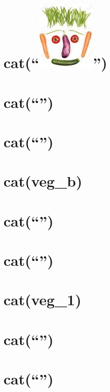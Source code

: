 \documentclass[]{article}
\begin{document}
\section{\texorpdfstring{cat(``\protect\includegraphics{vegetable.jpg}'')}{cat()}}\label{cat-12}

\section{\texorpdfstring{cat(``\n'')}{cat()}}\label{cat-13}

\section{\texorpdfstring{cat(``\n'')}{cat()}}\label{cat-14}

\section{cat(veg\_b)}\label{catveg_b}

\section{\texorpdfstring{cat(``\n'')}{cat()}}\label{cat-15}

\section{\texorpdfstring{cat(``\n'')}{cat()}}\label{cat-16}

\section{cat(veg\_1)}\label{catveg_1}

\section{\texorpdfstring{cat(``\n'')}{cat()}}\label{cat-17}

\section{\texorpdfstring{cat(``\n'')}{cat()}}\label{cat-18}
\end{document}
